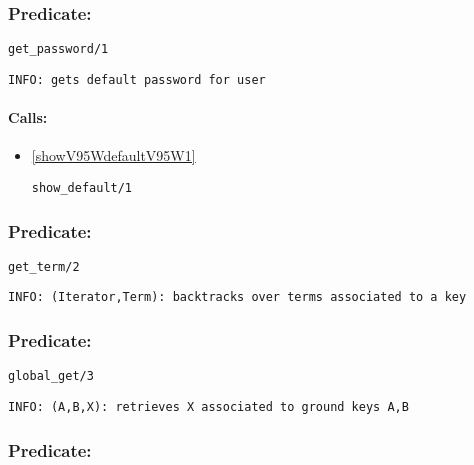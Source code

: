 \subsubsection{Predicate:} \label{getV95WpasswordV95W1}

\begin{verbatim}
get_password/1
\end{verbatim}

{\small \begin{verbatim}
INFO: gets default password for user

\end{verbatim}}
\paragraph{Calls:} 
\begin{itemize}
\item \ref{showV95WdefaultV95W1} 
\begin{verbatim}
show_default/1
\end{verbatim}

\end{itemize}

\subsubsection{Predicate:} \label{getV95WtermV95W2}

\begin{verbatim}
get_term/2
\end{verbatim}

{\small \begin{verbatim}
INFO: (Iterator,Term): backtracks over terms associated to a key

\end{verbatim}}

\subsubsection{Predicate:} \label{globalV95WgetV95W3}

\begin{verbatim}
global_get/3
\end{verbatim}

{\small \begin{verbatim}
INFO: (A,B,X): retrieves X associated to ground keys A,B

\end{verbatim}}

\subsubsection{Predicate:} \label{globalV95WrmV95W2}

